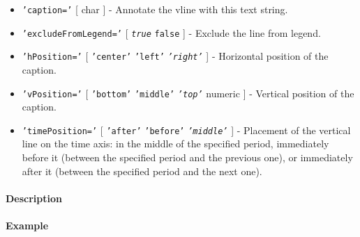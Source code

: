 \begin{itemize}
\item
  \texttt{'caption='} {[} char {]} - Annotate the vline with this text
  string.
\item
  \texttt{'excludeFromLegend='} {[} \emph{\texttt{true}} \textbar{}
  \texttt{false} {]} - Exclude the line from legend.
\item
  \texttt{'hPosition='} {[} \texttt{'center'} \textbar{} \texttt{'left'}
  \textbar{} \emph{\texttt{'right'}} {]} - Horizontal position of the
  caption.
\item
  \texttt{'vPosition='} {[} \texttt{'bottom'} \textbar{}
  \texttt{'middle'} \textbar{} \emph{\texttt{'top'}} \textbar{} numeric
  {]} - Vertical position of the caption.
\item
  \texttt{'timePosition='} {[} \texttt{'after'} \textbar{}
  \texttt{'before'} \textbar{} \emph{\texttt{'middle'}} {]} - Placement
  of the vertical line on the time axis: in the middle of the specified
  period, immediately before it (between the specified period and the
  previous one), or immediately after it (between the specified period
  and the next one).
\end{itemize}

\paragraph{Description}

\paragraph{Example}


